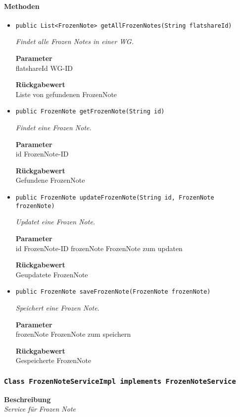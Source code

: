     \paragraph*{Methoden}
    \begin{itemize}
    	\item{\texttt{public List<FrozenNote> getAllFrozenNotes(String flatshareId)}}
    	
    	\textit{Findet alle Frozen Notes in einer WG.}
    	
    	\textbf{Parameter} \\
    	flatshareId WG-ID
    	
    	\textbf{Rückgabewert} \\
    	Liste von gefundenen FrozenNote        \item{\texttt{public FrozenNote getFrozenNote(String id)}}
    	
    	\textit{Findet eine Frozen Note.}
    	
    	\textbf{Parameter} \\
    	id FrozenNote-ID
    	
    	\textbf{Rückgabewert} \\
    	Gefundene FrozenNote        \item{\texttt{public FrozenNote updateFrozenNote(String id, FrozenNote frozenNote)}}
    	
    	\textit{Updatet eine Frozen Note.}
    	
    	\textbf{Parameter} \\
    	id FrozenNote-ID
    	frozenNote FrozenNote zum updaten
    	
    	\textbf{Rückgabewert} \\
    	Geupdatete FrozenNote        \item{\texttt{public FrozenNote saveFrozenNote(FrozenNote frozenNote)}}
    	
    	\textit{Speichert eine Frozen Note.}
    	
    	\textbf{Parameter} \\
    	frozenNote FrozenNote zum speichern
    	
    	\textbf{Rückgabewert} \\
    	Gespeicherte FrozenNote
    \end{itemize}
    \subsubsection{\texttt{Class FrozenNoteServiceImpl implements FrozenNoteService}}
    \textbf{Beschreibung} \\
    \textit{Service für Frozen Note}
